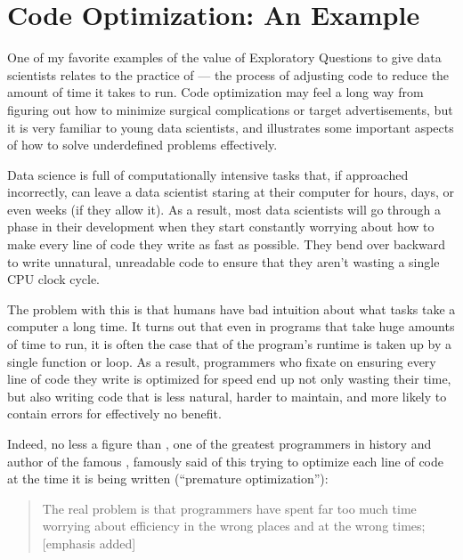 \documentclass[letterpaper,10pt,english]{jupyterBook}
\begin{document}
\section{Code Optimization: An Example}
\label{\detokenize{30_questions/10_using_exploratory_questions:code-optimization-an-example}}
\sphinxAtStartPar
One of my favorite examples of the value of Exploratory Questions to give data scientists relates to the practice of  — the process of adjusting code to reduce the amount of time it takes to run. Code optimization may feel a long way from figuring out how to minimize surgical complications or target advertisements, but it is very familiar to young data scientists, and illustrates some important aspects of how to solve underdefined problems effectively.

\sphinxAtStartPar
Data science is full of computationally intensive tasks that, if approached incorrectly, can leave a data scientist staring at their computer for hours, days, or even weeks (if they allow it). As a result, most data scientists will go through a phase in their development when they start constantly worrying about how to make every line of code they write as fast as possible. They bend over backward to write unnatural, unreadable code to ensure that they aren’t wasting a single CPU clock cycle.

\sphinxAtStartPar
The problem with this is that humans have  bad intuition about what tasks take a computer a long time. It turns out that even in programs that take huge amounts of time to run, it is often the case that  of the program’s runtime is taken up by a single function or loop. As a result, programmers who fixate on ensuring every line of code they write is optimized for speed end up not only wasting their  time, but also writing code that is less natural, harder to maintain, and more likely to contain errors for effectively no benefit.

\sphinxAtStartPar
Indeed, no less a figure than , one of the greatest programmers in history and author of the famous , famously said of this trying to optimize each line of code at the time it is being written (“premature optimization”):
\begin{quote}

\sphinxAtStartPar
The real problem is that programmers have spent far too much time worrying about efficiency in the wrong places and at the wrong times;  {[}emphasis added{]}
\end{quote}
\end{document}
